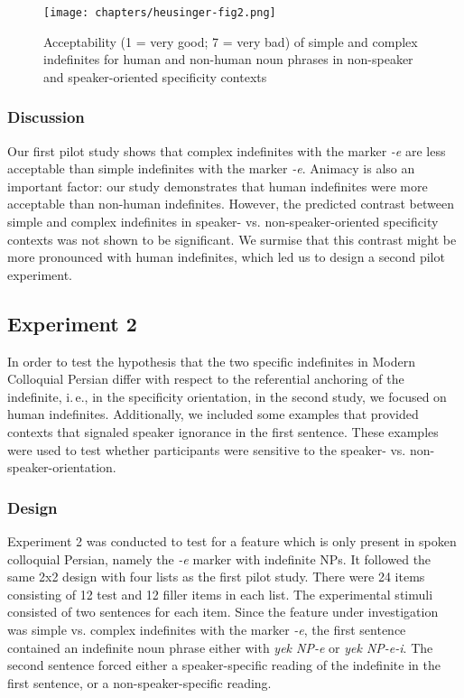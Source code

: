 \documentclass[output=paper]{langsci/langscibook}
\begin{document}
\begin{figure}[H]
\centering
\texttt{[image: chapters/heusinger-fig2.png]}
\caption{Acceptability (1 = very good; 7 = very bad) of simple and complex indefinites for human and non-human noun phrases in non-speaker and speaker-oriented specificity contexts}\label{4fig:2}
\end{figure}



\subsubsection{Discussion}\label{4sec:513}

{
Our first pilot study shows that complex indefinites with the marker {\emph{-e}} are less acceptable than simple indefinites with the marker {\emph{-e}}. Animacy is also an important factor: our study demonstrates that human indefinites were more acceptable than non-human indefinites. However, the predicted contrast between simple and complex indefinites in speaker- vs. non-speaker-oriented specificity contexts was not shown to be significant. We surmise that this contrast might be more pronounced with human indefinites, which led us to design a second pilot experiment.
}

\subsection{Experiment 2}\label{4sec:52}
In order to test the hypothesis that the two specific indefinites in Modern Colloquial Persian differ with respect to the referential anchoring of the indefinite, i.\,e., in the specificity orientation, in the second study, we focused on human indefinites. Additionally, we included some examples that provided contexts that signaled speaker ignorance in the first sentence. These examples were used to test whether participants were sensitive to the speaker- vs. non-speaker-orientation.

\subsubsection{Design}\label{3sec:521}

Experiment 2 was conducted to test for a feature which is only present in spoken colloquial Persian, namely the {\emph{-e}} marker with indefinite NPs. It followed the same 2x2 design with four lists as the first pilot study. There were 24 items consisting of 12 test and 12 filler items in each list. The experimental stimuli consisted of two sentences for each item. Since the feature under investigation was simple vs. complex indefinites with the marker {\emph{-e}}, the first sentence contained an indefinite noun phrase either with {\emph{yek NP-e}} or {\emph{yek NP-e-i}}. The second sentence forced either a speaker-specific reading of the indefinite in the first sentence, or a non-speaker-specific reading. 
\end{document}
